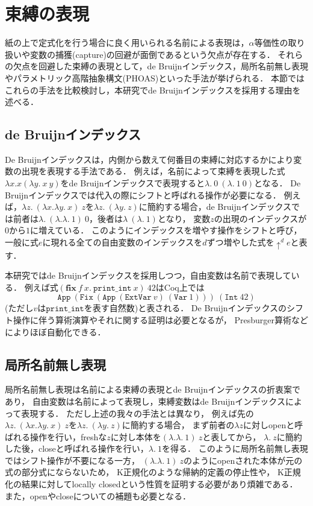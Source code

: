 \documentclass[T]{compsoft}
\newcommand{\keyword}[1]{\mathbf{#1}}
\newcommand{\FIX}{\keyword{fix}}
\begin{document}
\section{束縛の表現}\label{section:bindings}
紙の上で定式化を行う場合に良く用いられる名前による表現は，$\alpha$等価性の取り扱いや変数の捕獲(capture)の回避が面倒であるという欠点が存在する．
それらの欠点を回避した束縛の表現として，de Bruijnインデックス\cite{Pierce:TypeSystems}，局所名前無し表現\cite{chargueraud-11-ln}やパラメトリック高階抽象構文(PHOAS)\cite{Chlipala:2008:PHA:1411204.1411226}といった手法が挙げられる．
本節ではこれらの手法を比較検討し，本研究でde Bruijnインデックスを採用する理由を述べる．

\subsection{de Bruijnインデックス}
De Bruijnインデックスは，内側から数えて何番目の束縛に対応するかにより変数の出現を表現する手法である．
例えば，名前によって束縛を表現した式$\lambda x. x (\lambda y.~x~y)$をde Bruijnインデックスで表現すると$\lambda.~0~(\lambda.~1~0)$となる．
De Bruijnインデックスでは代入の際にシフトと呼ばれる操作が必要になる．
例えば，$\lambda z.~(\lambda x.\lambda y.~x)~z$を$\lambda z.~(\lambda y.~z)$に簡約する場合，de Bruijnインデックスでは前者は$\lambda.~(\lambda.\lambda.~1)~0$，後者は$\lambda~(\lambda.~1)$となり，
変数$z$の出現のインデックスが$0$から$1$に増えている．
このようにインデックスを増やす操作をシフトと呼び，
一般に式$e$に現れる全ての自由変数のインデックスを$d$ずつ増やした式を$\uparrow^d e$と表す．

本研究ではde Bruijnインデックスを採用しつつ，自由変数は名前で表現している．
例えば式$(\FIX~f~x.~\texttt{print\_int}~x)~42$はCoq上では
\[\texttt{App}~(\texttt{Fix}~(\texttt{App}~(\texttt{ExtVar}~v)~(\texttt{Var}~1)))~(\texttt{Int}~42)\]
(ただし$v$は$\texttt{print\_int}$を表す自然数)と表される．
De Bruijnインデックスのシフト操作に伴う算術演算やそれに関する証明は必要となるが，
Presburger算術などによりほぼ自動化できる．

\subsection{局所名前無し表現}
局所名前無し表現\cite{chargueraud-11-ln}は名前による束縛の表現とde Bruijnインデックスの折衷案であり，
自由変数は名前によって表現し，束縛変数はde Bruijnインデックスによって表現する．
ただし上述の我々の手法とは異なり，
例えば先の$\lambda z.~(\lambda x.\lambda y.~x)~z$を$\lambda z.~(\lambda y.~z)$に簡約する場合，
まず前者の$\lambda z$に対しopenと呼ばれる操作を行い，freshな$z$に対し本体を$(\lambda .\lambda.~1)~z$と表してから，
$\lambda.~z$に簡約した後，closeと呼ばれる操作を行い，$\lambda.~1$を得る．
このように局所名前無し表現ではシフト操作が不要になる一方，
$(\lambda .\lambda.~1)~z$のようにopenされた本体が元の式の部分式にならないため，
K正規化のような帰納的定義の停止性や，
K正規化の結果に対してlocally closedという性質を証明する必要があり煩雑である．
また，openやcloseについての補題も必要となる．
\end{document}
